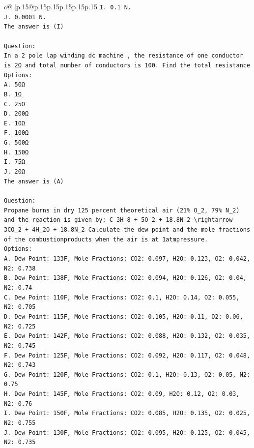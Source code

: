 \documentclass{article}
\begin{document}
{\begin{supertabular}{c@{$\;$}|p{.15\linewidth}@{}p{.15\linewidth}p{.15\linewidth}p{.15\linewidth}p{.15\linewidth}p{.15\linewidth}}
{{{\texttt{I. 0.1 N.} \\
\texttt{J. 0.0001 N.} \\
\texttt{The answer is (I)} \\
\\ 
\texttt{Question:} \\
\texttt{In a 2 pole lap winding dc machine , the resistance of one conductor is 2Ω and total number of conductors is 100. Find the total resistance} \\
\texttt{Options:} \\
\texttt{A. 50Ω} \\
\texttt{B. 1Ω} \\
\texttt{C. 25Ω} \\
\texttt{D. 200Ω} \\
\texttt{E. 10Ω} \\
\texttt{F. 100Ω} \\
\texttt{G. 500Ω} \\
\texttt{H. 150Ω} \\
\texttt{I. 75Ω} \\
\texttt{J. 20Ω} \\
\texttt{The answer is (A)} \\
\\ 
\texttt{Question:} \\
\texttt{Propane burns in dry 125 percent theoretical air (21\% O\_2, 79\% N\_2) and the reaction is given by: C\_3H\_8 + 5O\_2 + 18.8N\_2 \textbackslash{}rightarrow 3CO\_2 + 4H\_2O + 18.8N\_2 Calculate the dew point and the mole fractions of the combustionproducts when the air is at 1atmpressure.} \\
\texttt{Options:} \\
\texttt{A. Dew Point: 133F, Mole Fractions: CO2: 0.097, H2O: 0.123, O2: 0.042, N2: 0.738} \\
\texttt{B. Dew Point: 138F, Mole Fractions: CO2: 0.094, H2O: 0.126, O2: 0.04, N2: 0.74} \\
\texttt{C. Dew Point: 110F, Mole Fractions: CO2: 0.1, H2O: 0.14, O2: 0.055, N2: 0.705} \\
\texttt{D. Dew Point: 115F, Mole Fractions: CO2: 0.105, H2O: 0.11, O2: 0.06, N2: 0.725} \\
\texttt{E. Dew Point: 142F, Mole Fractions: CO2: 0.088, H2O: 0.132, O2: 0.035, N2: 0.745} \\
\texttt{F. Dew Point: 125F, Mole Fractions: CO2: 0.092, H2O: 0.117, O2: 0.048, N2: 0.743} \\
\texttt{G. Dew Point: 120F, Mole Fractions: CO2: 0.1, H2O: 0.13, O2: 0.05, N2: 0.75} \\
\texttt{H. Dew Point: 145F, Mole Fractions: CO2: 0.09, H2O: 0.12, O2: 0.03, N2: 0.76} \\
\texttt{I. Dew Point: 150F, Mole Fractions: CO2: 0.085, H2O: 0.135, O2: 0.025, N2: 0.755} \\
\texttt{J. Dew Point: 130F, Mole Fractions: CO2: 0.095, H2O: 0.125, O2: 0.045, N2: 0.735} \\
            }
        }
    }
     \\ \\


\end{supertabular}}
\end{document}

